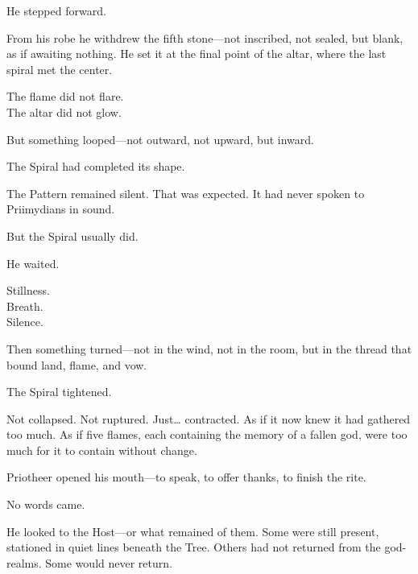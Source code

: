 \documentclass[9pt]{article}
\begin{document}
\vspace{0.5em}
He stepped forward.

\vspace{0.5em}
From his robe he withdrew the fifth stone---not inscribed, not sealed, but blank, as if awaiting nothing. He set it at the final point of the altar, where the last spiral met the center.

\vspace{0.5em}
The flame did not flare.\\
The altar did not glow.

\vspace{0.5em}
But something looped---not outward, not upward, but inward.

\vspace{0.5em}
The Spiral had completed its shape.

\vspace{0.5em}
The Pattern remained silent. That was expected. It had never spoken to Priimydians in sound.

\vspace{0.5em}
But the Spiral usually did.

\vspace{0.5em}
He waited.

\vspace{0.5em}
Stillness.\\
Breath.\\
Silence.

\vspace{0.5em}
Then something turned---not in the wind, not in the room, but in the thread that bound land, flame, and vow.

\vspace{0.5em}
The Spiral tightened.

\vspace{0.5em}
Not collapsed. Not ruptured. Just\ldots{} contracted. As if it now knew it had gathered too much. As if five flames, each containing the memory of a fallen god, were too much for it to contain without change.

\vspace{0.5em}
Priotheer opened his mouth---to speak, to offer thanks, to finish the rite.

\vspace{0.5em}
No words came.

\vspace{0.5em}
He looked to the Host---or what remained of them. Some were still present, stationed in quiet lines beneath the Tree. Others had not returned from the god-realms. Some would never return.
\end{document}
